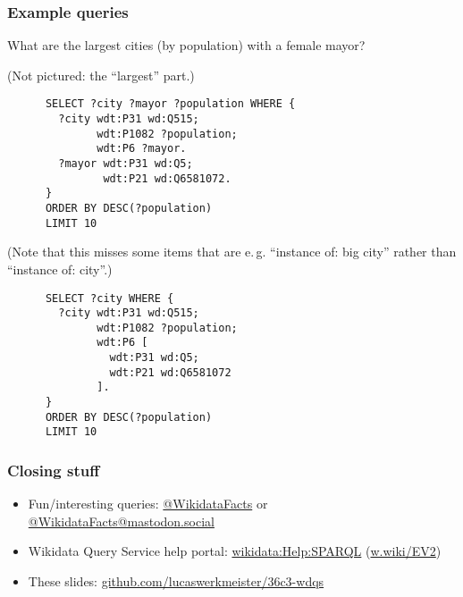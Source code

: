 \documentclass[aspectratio=169]{beamer}
\makeatletter
\newcommand{\Twitter}[1]{\href{https://twitter.com/#1}{@#1}}
\newcommand{\Mastodon}[2]{\href{https://#2/@#1}{@#1@#2}}
\makeatother
\begin{document}
\begin{frame}[fragile]
  \frametitle{Example queries}
  What are the largest cities (by population) with a female mayor?

  \begin{overprint}

    (Not pictured: the “largest” part.)
  
    \begin{lstlisting}
      SELECT ?city ?mayor ?population WHERE {
        ?city wdt:P31 wd:Q515;
              wdt:P1082 ?population;
              wdt:P6 ?mayor.
        ?mayor wdt:P31 wd:Q5;
               wdt:P21 wd:Q6581072.
      }
      ORDER BY DESC(?population)
      LIMIT 10
    \end{lstlisting}
    (Note that this misses some items that are e.\,g. “instance of: big city” rather than “instance of: city”.)
  
    \begin{lstlisting}
      SELECT ?city WHERE {
        ?city wdt:P31 wd:Q515;
              wdt:P1082 ?population;
              wdt:P6 [
                wdt:P31 wd:Q5;
                wdt:P21 wd:Q6581072
              ].
      }
      ORDER BY DESC(?population)
      LIMIT 10
    \end{lstlisting}
  \end{overprint}
\end{frame}

\begin{frame}
  \frametitle{Closing stuff}
  \begin{itemize}
  \item Fun/interesting queries: \Twitter{WikidataFacts} or \Mastodon{WikidataFacts}{mastodon.social}
  \item Wikidata Query Service help portal: \href{https://www.wikidata.org/wiki/Special:MyLanguage/Wikidata:SPARQL_query_service/Wikidata_Query_Help}{wikidata:Help:SPARQL} (\href{https://w.wiki/EV2}{w.wiki/EV2})
  \item These slides: \href{https://github.com/lucaswerkmeister/36c3-wdqs}{github.com/lucaswerkmeister/36c3-wdqs}
  \end{itemize}
\end{frame}
\end{document}
